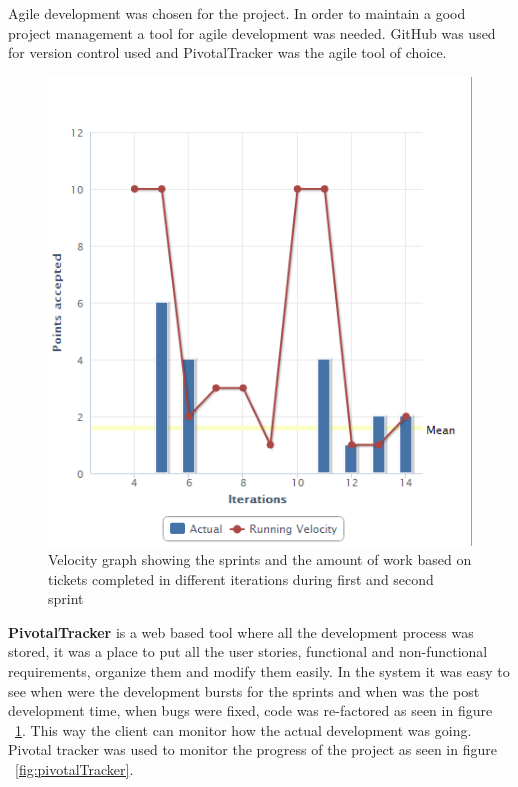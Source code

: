 Agile development was chosen for the project. In order to maintain a good project management a tool for
agile development was needed. GitHub \cite{github} was used for version control used and PivotalTracker \cite{pivotal}
was the agile tool of choice.

\begin{figure}[htp]
\centering
\includegraphics[scale=0.8]{Figures/pivotalGraph.png}
\caption{Velocity graph showing the sprints and the amount of work based on tickets completed in different iterations during first and second sprint}
\label{fig:pivotalGraph}
\end{figure}

\textbf{PivotalTracker} is a web based tool where all the development process was stored, it was a place to put all the user stories, functional
and non-functional requirements, organize them and modify them easily. In the system it was easy to see when were the development bursts for the
sprints and when was the post development time, when bugs were fixed, code was re-factored as seen in figure ~\ref{fig:pivotalGraph}.
This way the client can monitor how the actual development was going. Pivotal tracker was used to monitor the progress
of the project as seen in figure ~\ref{fig:pivotalTracker}.

